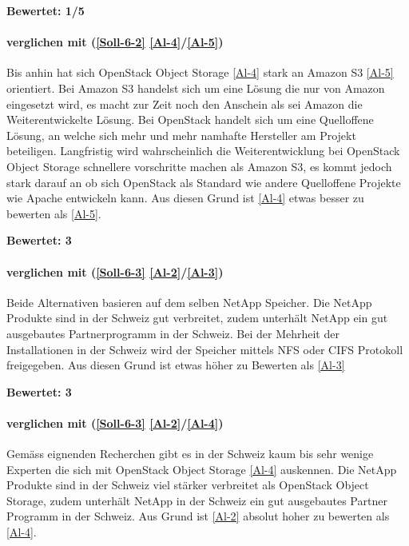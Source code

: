 \textbf{Bewertet: 1/5}

\paragraph*{  verglichen mit  (\ref{Soll-6-2} \ref{Al-4}/\ref{Al-5})}
Bis anhin hat sich OpenStack Object Storage \ref{Al-4} stark an Amazon S3 \ref{Al-5} orientiert. Bei Amazon S3 handelst sich um eine Lösung die nur von Amazon eingesetzt wird, es macht zur Zeit noch den Anschein als sei Amazon die Weiterentwickelte Lösung. Bei OpenStack handelt sich um eine Quelloffene Lösung, an welche sich mehr und mehr namhafte Hersteller am Projekt beteiligen. Langfristig wird wahrscheinlich die Weiterentwicklung bei OpenStack Object Storage schnellere vorschritte machen als Amazon S3, es kommt jedoch stark darauf an ob sich OpenStack als Standard wie andere Quelloffene Projekte wie Apache entwickeln kann.
Aus diesen Grund ist \ref{Al-4} etwas besser zu bewerten als \ref{Al-5}.

\textbf{Bewertet: 3}


\paragraph*{  verglichen mit  (\ref{Soll-6-3} \ref{Al-2}/\ref{Al-3})}
Beide Alternativen basieren auf dem selben NetApp Speicher. Die NetApp Produkte sind in der Schweiz gut verbreitet, zudem unterhält NetApp ein gut ausgebautes Partnerprogramm in der Schweiz. Bei der Mehrheit der Installationen in der Schweiz wird der Speicher mittels NFS oder CIFS Protokoll freigegeben. Aus diesen Grund ist  etwas höher zu Bewerten als  \ref{Al-3}

\textbf{Bewertet: 3}

\paragraph*{  verglichen mit  (\ref{Soll-6-3} \ref{Al-2}/\ref{Al-4})}
Gemäss eignenden Recherchen gibt es in der Schweiz kaum bis sehr wenige Experten die sich mit OpenStack Object Storage \ref{Al-4} auskennen. Die NetApp Produkte sind in der Schweiz viel stärker verbreitet als OpenStack Object Storage, zudem unterhält NetApp in der Schweiz ein gut ausgebautes Partner Programm in der Schweiz. Aus Grund ist  \ref{Al-2} absolut hoher zu bewerten als  \ref{Al-4}.

